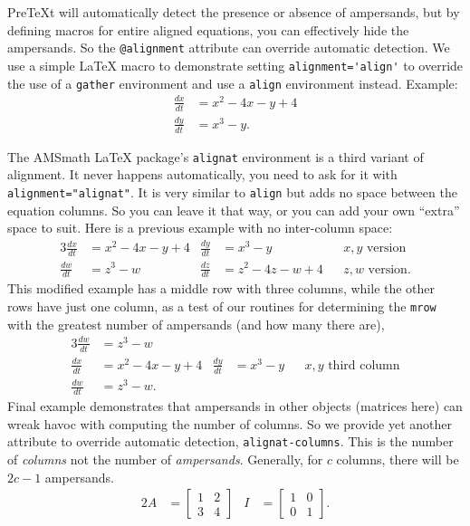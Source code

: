 \documentclass[10pt,]{article}
\theoremstyle{plain}
\theoremstyle{definition}
\theoremstyle{definition}
\theoremstyle{definition}
\theoremstyle{definition}
\theoremstyle{definition}
\theoremstyle{definition}
\numberwithin{equation}{section}
\newcommand{\myequation}[2]{#1\amp =#2}
\newcommand{\amp}{&}
\begin{document}
%
\par
\hypertarget{p-183}{}%
PreTeXt will automatically detect the presence or absence of ampersands, but by defining macros for entire aligned equations, you can effectively hide the ampersands.  So the \lstinline?@alignment? attribute can override automatic detection.  We use a simple \LaTeX{} macro to demonstrate setting \lstinline?alignment='align'? to override the use of a \lstinline?gather? environment and use a \lstinline?align? environment instead.  Example:%
\begin{align*}
\myequation{\frac{dx}{dt}}{x^2 - 4x - y + 4}\\
\myequation{\frac{dy}{dt}}{x^3 - y}.
\end{align*}
%
\par
\hypertarget{p-184}{}%
The AMSmath \LaTeX{} package's \lstinline?alignat? environment is a third variant of alignment.  It never happens automatically, you need to ask for it with \lstinline?alignment="alignat"?.  It is very similar to \lstinline?align? but adds no space between the equation columns.  So you can leave it that way, or you can add your own ``extra'' space to suit.  Here is a previous example with no inter-column space:%
\begin{alignat*}{3}
\frac{dx}{dt} \amp = x^2 - 4x - y + 4 \amp \frac{dy}{dt} \amp = x^3 - y          \amp\amp x, y\text{ version}\\
\frac{dw}{dt} \amp = z^3 - w          \amp \frac{dz}{dt} \amp = z^2 - 4z - w + 4 \amp\amp z, w\text{ version}\text{.}
\end{alignat*}
This modified example has a middle row with three columns, while the other rows have just one column, as a test of our routines for determining the \lstinline?mrow? with the greatest number of ampersands (and how many there are),%
\begin{alignat*}{3}
\frac{dw}{dt} &= z^3 - w\\
\frac{dx}{dt} &= x^2 - 4x - y + 4 & \frac{dy}{dt} &= x^3 - y&& x, y\text{ third column}\\
\frac{dw}{dt} & = z^3 - w\text{.}
\end{alignat*}
Final example demonstrates that ampersands in other objects (matrices here) can wreak havoc with computing the number of columns.  So we provide yet another attribute to override automatic detection, \lstinline?alignat-columns?.  This is the number of \emph{columns} not the number of \emph{ampersands}.  Generally, for \(c\) columns, there will be \(2c-1\) ampersands.%
\begin{alignat*}{2}
A &= \begin{bmatrix}1 & 2 \\ 3 & 4\end{bmatrix}
&
I &= \begin{bmatrix}1 & 0 \\ 0 & 1\end{bmatrix}\text{.}
\end{alignat*}
\end{document}
